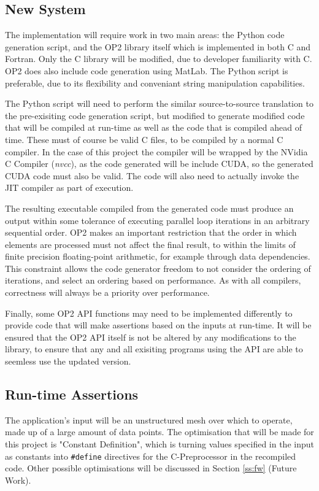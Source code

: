 \subsection{New System}
The implementation will require work in two main areas: the Python code generation script, and the OP2 library itself which is implemented in both C and Fortran. Only the C library will be modified, due to developer familiarity with C. OP2 does also include code generation using MatLab. The Python script is preferable, due to its flexibility and conveniant string manipulation capabilities.
\par
The Python script will need to perform the similar source-to-source translation to the pre-exisiting code generation script, but modified to generate modified code that will be compiled at run-time as well as the code that is compiled ahead of time. These must of course be valid C files, to be compiled by a normal C compiler. In the case of this project the compiler will be wrapped by the NVidia C Compiler (\textit{nvcc}), as the code generated will be include CUDA, so the generated CUDA code must also be valid.
The code will also need to actually invoke the JIT compiler as part of execution.
\par
The resulting executable compiled from the generated code must produce an output within some tolerance of executing parallel loop iterations in an arbitrary sequential order. OP2 makes an important restriction that the order in which elements are processed must not affect the final result, to within the limits of finite precision floating-point arithmetic\cite[p3]{op2main}, for example through data dependencies. This constraint allows the code generator freedom to not consider the ordering of iterations, and select an ordering based on performance. As with all compilers, correctness will always be a priority over performance.
\par
Finally, some OP2 API functions may need to be implemented differently to provide code that will make assertions based on the inputs at run-time. It will be ensured that the OP2 API itself is not be altered by any modifications to the library, to ensure that any and all exisiting programs using the API are able to seemless use the updated version.

\subsection{Run-time Assertions}
The application's input will be an unstructured mesh over which to operate, made up of a large amount of data points. The optimisation that will be made for this project is "Constant Definition", which is turning values specified in the input as constants into \verb|#define| directives for the C-Preprocessor in the recompiled code. Other possible optimisations will be discussed in Section \ref{ss:fw} (Future Work).

